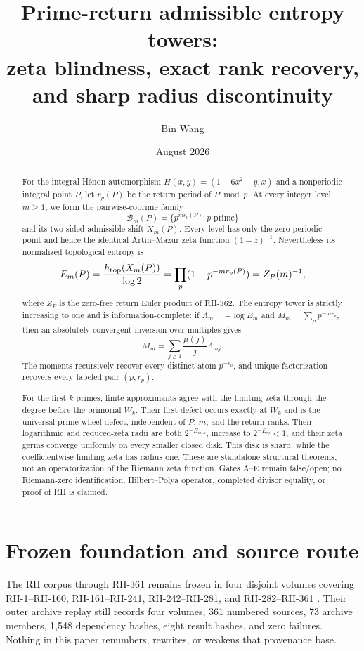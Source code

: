 \documentclass[11pt]{article}
\title{Prime-return admissible entropy towers:\\
zeta blindness, exact rank recovery, and sharp radius discontinuity}
\author{Bin Wang}
\date{August 2026}
\numberwithin{equation}{section}
\theoremstyle{remark}
\newcommand{\cB}{\mathcal B}
\begin{document}
\maketitle

\begin{abstract}
For the integral H\'enon automorphism
\(
H(x,y)=(1-6x^2-y,x)
\)
and a nonperiodic integral point $P$, let $r_p(P)$ be the return period
of $P\bmod p$.  At every integer level $m\ge1$, we form the
pairwise-coprime family
\[
 \cB_m(P)=\{p^{m r_p(P)}:p\text{ prime}\}
\]
and its two-sided admissible shift $X_m(P)$.  Every level has only the zero
periodic point and hence the identical Artin--Mazur zeta function
\((1-z)^{-1}\).  Nevertheless its normalized topological entropy is
\[
 E_m(P)=\frac{h_{\rm top}(X_m(P))}{\log2}
 =\prod_p(1-p^{-m r_p(P)})=Z_P(m)^{-1},
\]
where $Z_P$ is the zero-free return Euler product of RH-362.  The entropy
tower is strictly increasing to one and is information-complete: if
\(
\Lambda_m=-\log E_m
\)
and
\(
M_m=\sum_p p^{-m r_p}
\), then an absolutely convergent inversion over multiples gives
\[
 M_m=\sum_{j\ge1}\frac{\mu(j)}j\Lambda_{mj}.
\]
The moments recursively recover every distinct atom $p^{-r_p}$, and
unique factorization recovers every labeled pair $(p,r_p)$.

For the first $k$ primes, finite approximants agree with the limiting zeta
through the degree before the primorial $W_k$.  Their first defect occurs
exactly at $W_k$ and is the universal prime-wheel defect, independent of
$P$, $m$, and the return ranks.  Their logarithmic and reduced-zeta
radii are both $2^{-E_{m,k}}$, increase to $2^{-E_m}<1$, and their zeta
germs converge uniformly on every smaller closed disk.  This disk is sharp,
while the coefficientwise limiting zeta has radius one.  These are
standalone structural theorems, not an operatorization of the Riemann zeta
function.  Gates A--E remain false/open; no Riemann-zero identification,
Hilbert--Polya operator, completed divisor equality, or proof of RH is
claimed.
\end{abstract}

\section{Frozen foundation and source route}

The RH corpus through RH-361 remains frozen in four disjoint volumes covering
RH-1--RH-160, RH-161--RH-241, RH-242--RH-281, and RH-282--RH-361
\citep{WangRHCorpus2026}.  Their outer archive replay still records four
volumes, 361 numbered sources, 73 archive members, 1,548 dependency hashes,
eight result hashes, and zero failures.  Nothing in this paper renumbers,
rewrites, or weakens that provenance base.
\end{document}

